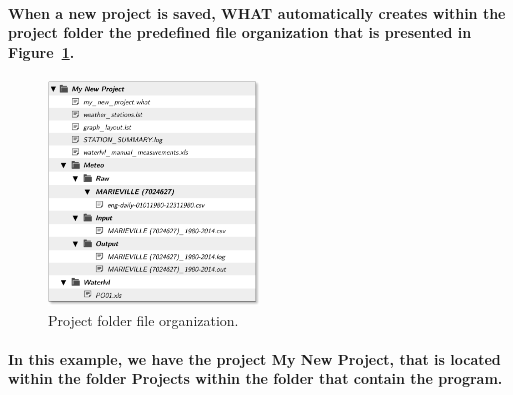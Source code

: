 \documentclass[10pt, letterpaper, fleqn]{report}
\begin{document}
\paragraph{When a new project is saved, WHAT automatically creates within the project folder the predefined file organization that is presented in Figure~\ref{fig:proFolder_organization}.}

\begin{figure}[h!]
\centering
\includegraphics[width=0.5\textwidth]{file_and_folder_architecture}
\caption[Project folder file organization.]{Project folder file organization.}
\label{fig:proFolder_organization}
\end{figure}



\paragraph{In this example, we have the project My New Project, that is located within the folder Projects within the folder that contain the program.}
\end{document}
